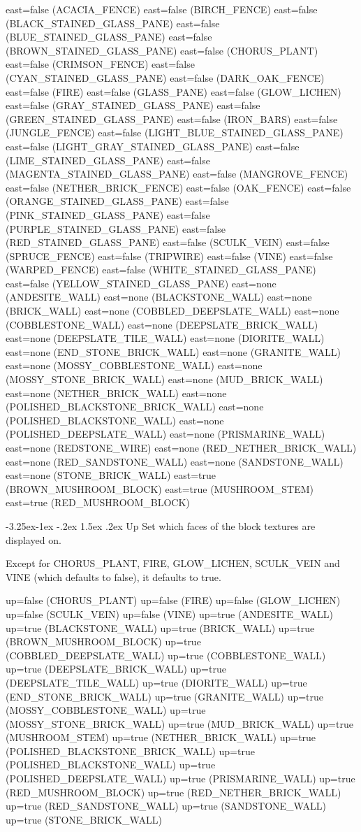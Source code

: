 \documentclass[11pt]{article}
\makeatletter
\renewcommand\subsubsection{\@startsection{subsubsection}{3}{\z@}%
                                        {-3.25ex\@plus -1ex \@minus -.2ex}%
                                         {1.5ex \@plus .2ex}%
                                         {\normalfont\normalsize\fontfamily{phv}\fontsize{14}{17}\selectfont}}
\makeatother
\begin{document}
east=false (ACACIA_FENCE)
east=false (BIRCH_FENCE)
east=false (BLACK_STAINED_GLASS_PANE)
east=false (BLUE_STAINED_GLASS_PANE)
east=false (BROWN_STAINED_GLASS_PANE)
east=false (CHORUS_PLANT)
east=false (CRIMSON_FENCE)
east=false (CYAN_STAINED_GLASS_PANE)
east=false (DARK_OAK_FENCE)
east=false (FIRE)
east=false (GLASS_PANE)
east=false (GLOW_LICHEN)
east=false (GRAY_STAINED_GLASS_PANE)
east=false (GREEN_STAINED_GLASS_PANE)
east=false (IRON_BARS)
east=false (JUNGLE_FENCE)
east=false (LIGHT_BLUE_STAINED_GLASS_PANE)
east=false (LIGHT_GRAY_STAINED_GLASS_PANE)
east=false (LIME_STAINED_GLASS_PANE)
east=false (MAGENTA_STAINED_GLASS_PANE)
east=false (MANGROVE_FENCE)
east=false (NETHER_BRICK_FENCE)
east=false (OAK_FENCE)
east=false (ORANGE_STAINED_GLASS_PANE)
east=false (PINK_STAINED_GLASS_PANE)
east=false (PURPLE_STAINED_GLASS_PANE)
east=false (RED_STAINED_GLASS_PANE)
east=false (SCULK_VEIN)
east=false (SPRUCE_FENCE)
east=false (TRIPWIRE)
east=false (VINE)
east=false (WARPED_FENCE)
east=false (WHITE_STAINED_GLASS_PANE)
east=false (YELLOW_STAINED_GLASS_PANE)
east=none (ANDESITE_WALL)
east=none (BLACKSTONE_WALL)
east=none (BRICK_WALL)
east=none (COBBLED_DEEPSLATE_WALL)
east=none (COBBLESTONE_WALL)
east=none (DEEPSLATE_BRICK_WALL)
east=none (DEEPSLATE_TILE_WALL)
east=none (DIORITE_WALL)
east=none (END_STONE_BRICK_WALL)
east=none (GRANITE_WALL)
east=none (MOSSY_COBBLESTONE_WALL)
east=none (MOSSY_STONE_BRICK_WALL)
east=none (MUD_BRICK_WALL)
east=none (NETHER_BRICK_WALL)
east=none (POLISHED_BLACKSTONE_BRICK_WALL)
east=none (POLISHED_BLACKSTONE_WALL)
east=none (POLISHED_DEEPSLATE_WALL)
east=none (PRISMARINE_WALL)
east=none (REDSTONE_WIRE)
east=none (RED_NETHER_BRICK_WALL)
east=none (RED_SANDSTONE_WALL)
east=none (SANDSTONE_WALL)
east=none (STONE_BRICK_WALL)
east=true (BROWN_MUSHROOM_BLOCK)
east=true (MUSHROOM_STEM)
east=true (RED_MUSHROOM_BLOCK)

\subsubsection{Up}
Set which faces of the block textures are displayed on.

Except for CHORUS\_PLANT, FIRE, GLOW\_LICHEN, SCULK\_VEIN and VINE (which defaults to false), it defaults to true.

up=false (CHORUS_PLANT)
up=false (FIRE)
up=false (GLOW_LICHEN)
up=false (SCULK_VEIN)
up=false (VINE)
up=true (ANDESITE_WALL)
up=true (BLACKSTONE_WALL)
up=true (BRICK_WALL)
up=true (BROWN_MUSHROOM_BLOCK)
up=true (COBBLED_DEEPSLATE_WALL)
up=true (COBBLESTONE_WALL)
up=true (DEEPSLATE_BRICK_WALL)
up=true (DEEPSLATE_TILE_WALL)
up=true (DIORITE_WALL)
up=true (END_STONE_BRICK_WALL)
up=true (GRANITE_WALL)
up=true (MOSSY_COBBLESTONE_WALL)
up=true (MOSSY_STONE_BRICK_WALL)
up=true (MUD_BRICK_WALL)
up=true (MUSHROOM_STEM)
up=true (NETHER_BRICK_WALL)
up=true (POLISHED_BLACKSTONE_BRICK_WALL)
up=true (POLISHED_BLACKSTONE_WALL)
up=true (POLISHED_DEEPSLATE_WALL)
up=true (PRISMARINE_WALL)
up=true (RED_MUSHROOM_BLOCK)
up=true (RED_NETHER_BRICK_WALL)
up=true (RED_SANDSTONE_WALL)
up=true (SANDSTONE_WALL)
up=true (STONE_BRICK_WALL)
\end{document}
